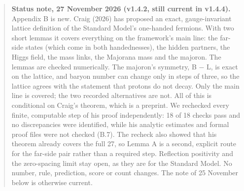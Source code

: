 \documentclass[
  11pt,
]{article}
\begin{document}
\begin{quote}
\textbf{Status note, 27 November 2026 (v1.4.2, still current in v1.4.4).} Appendix B is new. Craig (2026) has proposed an exact, gauge-invariant lattice definition of the Standard Model's one-handed fermions. With two short lemmas it covers everything on the framework's main line: the far-side states (which come in both handednesses), the hidden partners, the Higgs field, the mass links, the Majorana mass and the majoron. The lemmas are checked numerically. The majoron's symmetry, B \ensuremath{-} L, is exact on the lattice, and baryon number can change only in steps of three, so the lattice agrees with the statement that protons do not decay. Only the main line is covered; the two recorded alternatives are not. All of this is conditional on Craig's theorem, which is a preprint. We rechecked every finite, computable step of his proof independently: 18 of 18 checks pass and no discrepancies were identified, while his analytic estimates and formal proof files were not checked (B.7). The recheck also showed that his theorem already covers the full 27, so Lemma A is a second, explicit route for the far-side pair rather than a required step. Reflection positivity and the zero-spacing limit stay open, as they are for the Standard Model. No number, rule, prediction, score or count changes. The note of 25 November below is otherwise current.
\end{quote}
\end{document}
